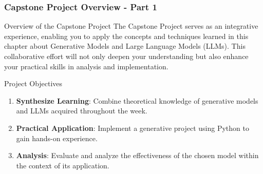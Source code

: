 \documentclass[aspectratio=169]{beamer}
\begin{document}
\begin{frame}[fragile]
    \frametitle{Capstone Project Overview - Part 1}
    \begin{block}{Overview of the Capstone Project}
        The Capstone Project serves as an integrative experience, enabling you to apply the concepts and techniques learned in this chapter about Generative Models and Large Language Models (LLMs). 
        This collaborative effort will not only deepen your understanding but also enhance your practical skills in analysis and implementation.
    \end{block}
    \begin{block}{Project Objectives}
        \begin{enumerate}
            \item \textbf{Synthesize Learning}: Combine theoretical knowledge of generative models and LLMs acquired throughout the week.
            \item \textbf{Practical Application}: Implement a generative project using Python to gain hands-on experience.
            \item \textbf{Analysis}: Evaluate and analyze the effectiveness of the chosen model within the context of its application.
        \end{enumerate}
    \end{block}
\end{frame}
\end{document}
